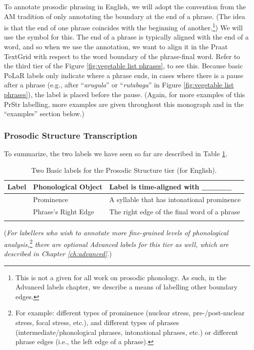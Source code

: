 \documentclass[11pt, twoside]{memoir}
\def\textlabel#1{{\relsize{-.5}\fontspec[Mapping=tex-text]{Roboto Mono}{#1}}}
\def\langtext#1{\textit{#1}}
\begin{document}
To annotate prosodic phrasing in English, we will adopt the convention from the AM tradition of only annotating the boundary at the end of a phrase. (The idea is that the end of one phrase coincides with the beginning of another.\footnote{This is not a given for all work on prosodic phonology. As such, in the Advanced labels chapter, we describe a means of labelling other boundary edges.}) We will use the \textlabel{]} symbol for this. The end of a phrase is typically aligned with the end of a word, and so when we use the \textlabel{]} annotation, we want to align it in the Praat TextGrid with respect to the word boundary of the phrase-final word. Refer to the third tier of the Figure \ref{fig:vegetable list phrases}, to see this. Because basic PoLaR labels only indicate where a phrase ends, in cases where there is a pause after a phrase (e.g., after “\langtext{arugula}” or “\langtext{rutabaga}” in Figure \ref{fig:vegetable list phrases}), the \textlabel{]} label is placed before the pause. (Again, for more examples of this PrStr labelling, more examples are given throughout this monograph and in the “examples” section below.)

\subsubsection{Prosodic Structure Transcription}
To summarize, the two labels we have seen so far are described in Table \ref{2 PrStr basic labels}.

\begin{longtable}{cll} \toprule \textbf{Label} & \textbf{Phonological Object} & \textbf{Label is time-aligned with \_\_\_\_\_}\tabularnewline
\midrule \endhead
\textlabel{*} & Prominence & A syllable that has intonational prominence \tabularnewline
\textlabel{]} & Phrase’s Right Edge & The right edge of the final word of a phrase \tabularnewline
\bottomrule 
\caption{Two Basic labels for the Prosodic Structure tier (for English).%
\label{2 PrStr basic labels}%
}
\end{longtable}

(\textit{For labellers who wish to annotate more fine-grained levels of phonological analysis,}\footnote{For example: different types of prominence (nuclear stress, pre-\slash post-nuclear stress, focal stress, etc.), and different types of phrases (intermediate\slash phonological phrases, intonational phrases, etc.) or different phrase edges (i.e., the left edge of a phrase).} \textit{there are optional Advanced labels for this tier as well, which are described in Chapter \ref{ch:advanced}.})
\end{document}
